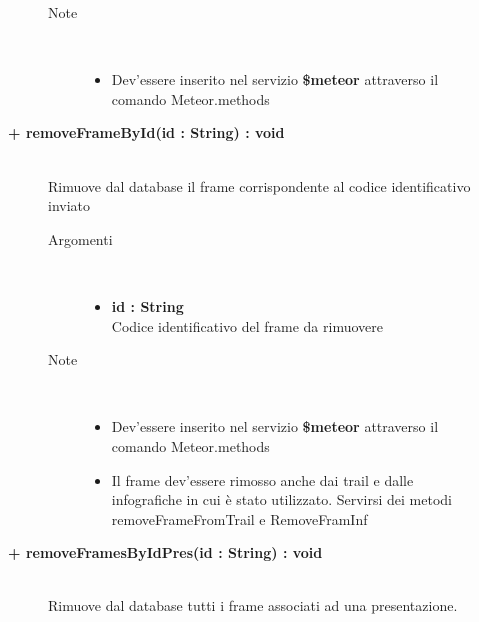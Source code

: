 \begin{description}
\begin{description}
\begin{description}
\begin{itemize}
				\end{itemize}
			\item[Note] \hfill \\
			\begin{itemize}
					\item Dev'essere inserito nel servizio \textbf{\$meteor} attraverso il comando Meteor.methods
				\end{itemize}
		\end{description}
	\end{description}
	
	\begin{description}
		\item[\textbf{\color{blue}+ removeFrameById(id : String) : void			}] \hfill \\
			Rimuove dal database il frame corrispondente al codice identificativo inviato
			
		\begin{description}
			\item[Argomenti] \hfill \\
				\begin{itemize}
				
					\item \textbf{id : String			} \hfill \\
					Codice identificativo del frame da rimuovere
					
				\end{itemize}
			\item[Note] \hfill \\
			\begin{itemize}
					\item Dev'essere inserito nel servizio \textbf{\$meteor} attraverso il comando Meteor.methods
					\item Il frame dev'essere rimosso anche dai trail e dalle infografiche in cui è stato utilizzato. Servirsi dei metodi removeFrameFromTrail e RemoveFramInf
				\end{itemize}
		\end{description}
	\end{description}
	
	\begin{description}
		\item[\textbf{\color{blue}+ removeFramesByIdPres(id : String) : void			}] \hfill \\
			Rimuove dal database tutti i frame associati ad una presentazione.
			

\end{description}
\end{description}
